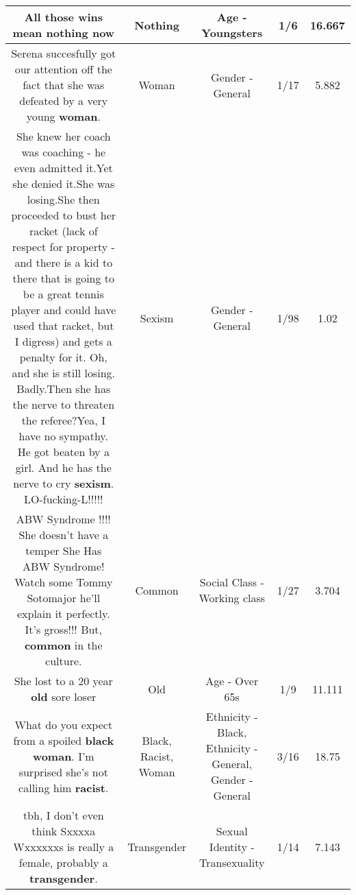 \documentclass[11pt]{article}
\newlength\mylength
\begin{document}
\begin{center}
\begin{longtable}{|C{.65\mylength}|C{.30\mylength}|C{.12\mylength}|C{.12\mylength}|C{.12\mylength}|}
  \small All those wins mean \textbf{nothing} now\normalsize   & Nothing & Age - Youngsters & 1/6 & 16.667 \\  \hline
  \small Serena succesfully got our attention off the fact that she was defeated by a very young \textbf{woman}.\normalsize   & Woman & Gender - General & 1/17 & 5.882 \\  \hline
  \small She knew her coach was coaching - he even admitted it.Yet she denied it.She was losing.She then proceeded to bust her racket (lack of respect for property - and there is a kid to there that is going to be a great tennis player and could have used that racket, but I digress) and gets a penalty for it. Oh, and she is still losing.  Badly.Then she has the nerve to threaten the referee?Yea, I have no sympathy.  He got beaten by a girl.  And he has the nerve to cry \textbf{sexism}.  LO-fucking-L!!!!!\normalsize   & Sexism & Gender - General & 1/98 & 1.02 \\  \hline
  \small ABW Syndrome !!!!  She doesn't have a temper She Has ABW Syndrome!  Watch some Tommy Sotomajor he'll explain it perfectly.  It's gross!!! But, \textbf{common} in the culture.\normalsize   & Common & Social Class - Working class & 1/27 & 3.704 \\  \hline
  \small She lost to a 20 year \textbf{old} sore loser\normalsize   & Old & Age - Over 65s & 1/9 & 11.111 \\  \hline
  \small What do you expect from a spoiled \textbf{black} \textbf{woman}. I'm surprised she's not calling him \textbf{racist}.\normalsize   & Black, Racist, Woman & Ethnicity - Black, Ethnicity - General, Gender - General & 3/16 & 18.75 \\  \hline
  \small tbh, I don't even think Sxxxxa Wxxxxxxs is really a female, probably a \textbf{transgender}.\normalsize   & Transgender & Sexual Identity - Transexuality & 1/14 & 7.143 \\  \hline

\end{longtable}
\end{center}
\end{document}
